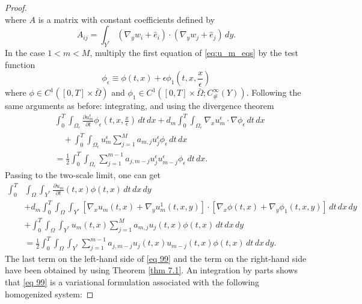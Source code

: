 \begin{proof}
\begin{equation}
\label{eq 97}\end{equation}
where $A$ is a matrix with constant coefficients defined by
$$
A_{i j}=\int_{Y^{*}}\left(\nabla_{y} w_{i}+\hat{e}_{i}\right) \cdot\left(\nabla_{y} w_{j}+\hat{e}_{j}\right) \, d  y .
$$
In the case $1<m<M$, multiply the first equation of \eqref{eq:u_m_eqs} by the test function
$$
\phi_{\epsilon} \equiv \phi(t, x)+\epsilon \phi_{1}\left(t, x, \frac{x}{\epsilon}\right)
$$
where $\phi \in C^{1}([0, T] \times \bar{\Omega})$ and $\phi_{1} \in C^{1}\left([0, T] \times \bar{\Omega} ; C_{\#}^{\infty}(Y)\right)$. Following the same arguments as before: integrating, and using the divergence theorem 
\begin{equation}
 \begin{aligned}
&\int_{0}^{T} \int_{\Omega_{\epsilon}} \frac{\partial u_{m}^{\epsilon}}{\partial t} \phi_{\epsilon}\left(t, x, \frac{x}{\epsilon}\right) \, d  t \, d  x+d_{m} \int_{0}^{T} \int_{\Omega_{\epsilon}} \nabla_{x} u_{m}^{\epsilon} \cdot \nabla \phi_{\epsilon} \, d  t \, d  x \\
&\quad+\int_{0}^{T} \int_{\Omega_{\epsilon}} u_{m}^{\epsilon} \sum_{j=1}^{M} a_{m, j} u_{j}^{\epsilon} \phi_{\epsilon} \, d  t \, d  x \\
&=\frac{1}{2} \int_{0}^{T} \int_{\Omega_{\epsilon}} \sum_{j=1}^{m-1} a_{j, m-j} u_{j}^{\epsilon} u_{m-j}^{\epsilon} \phi_{\epsilon} \, d  t \, d  x.
\end{aligned}
\label{eq 98}\end{equation}
Passing to the two-scale limit, one can get 
\begin{equation}
 \begin{aligned}
\int_{0}^{T} & \int_{\Omega} \int_{Y^{*}} \frac{\partial u_{m}}{\partial t}(t, x) \phi(t, x) \, d  t \, d  x \, d  y \\
&+d_{m} \int_{0}^{T} \int_{\Omega} \int_{Y^{*}}\left[\nabla_{x} u_{m}(t, x)+\nabla_{y} u_{m}^{1}(t, x, y)\right] \cdot\left[\nabla_{x} \phi(t, x)+\nabla_{y} \phi_{1}(t, x, y)\right] \, d  t \, d  x \, d  y \\
&+\int_{0}^{T} \int_{\Omega} \int_{Y^{*}} u_{m}(t, x) \sum_{j=1}^{M} a_{m, j} u_{j}(t, x) \phi(t, x) \, d  t \, d  x \, d  y \\
&=\frac{1}{2} \int_{0}^{T} \int_{\Omega} \int_{Y^{*}} \sum_{j=1}^{m-1} a_{j, m-j} u_{j}(t, x) u_{m-j}(t, x) \phi(t, x) \, d  t \, d  x \, d  y.
\end{aligned}
\label{eq 99}\end{equation}
The last term on the left-hand side of \eqref{eq 99} and the term on the right-hand side have been obtained by using Theorem \eqref{thm 7.1}. An integration by parts shows that \eqref{eq 99} is a variational formulation associated with the following homogenized system:

\end{proof}
